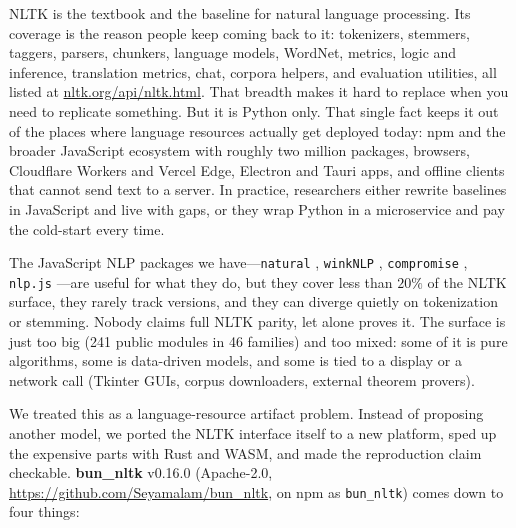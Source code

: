 \documentclass[smallextended]{svjour3}
\begin{document}
NLTK \cite{bird2009nltk,loper2002nltk} is the textbook and the baseline for natural language processing. Its coverage is the reason people keep coming back to it: tokenizers, stemmers, taggers, parsers, chunkers, language models, WordNet, metrics, logic and inference, translation metrics, chat, corpora helpers, and evaluation utilities, all listed at \url{nltk.org/api/nltk.html}. That breadth makes it hard to replace when you need to replicate something. But it is Python only. That single fact keeps it out of the places where language resources actually get deployed today: npm and the broader JavaScript ecosystem with roughly two million packages, browsers, Cloudflare Workers and Vercel Edge, Electron and Tauri apps, and offline clients that cannot send text to a server. In practice, researchers either rewrite baselines in JavaScript and live with gaps, or they wrap Python in a microservice and pay the cold-start every time.

The JavaScript NLP packages we have---\texttt{natural} \cite{natural2024}, \texttt{winkNLP} \cite{winknlp2024}, \texttt{compromise} \cite{compromise2024}, \texttt{nlp.js} \cite{nlpjs2024}---are useful for what they do, but they cover less than $20\%$ of the NLTK surface, they rarely track versions, and they can diverge quietly on tokenization or stemming. Nobody claims full NLTK parity, let alone proves it. The surface is just too big (241 public modules in 46 families) and too mixed: some of it is pure algorithms, some is data-driven models, and some is tied to a display or a network call (Tkinter GUIs, corpus downloaders, external theorem provers).

We treated this as a language-resource artifact problem. Instead of proposing another model, we ported the NLTK interface itself to a new platform, sped up the expensive parts with Rust and WASM, and made the reproduction claim checkable. \textbf{bun\_nltk} v0.16.0 (Apache-2.0, \url{https://github.com/Seyamalam/bun_nltk}, on npm as \texttt{bun\_nltk}) comes down to four things:
\end{document}
